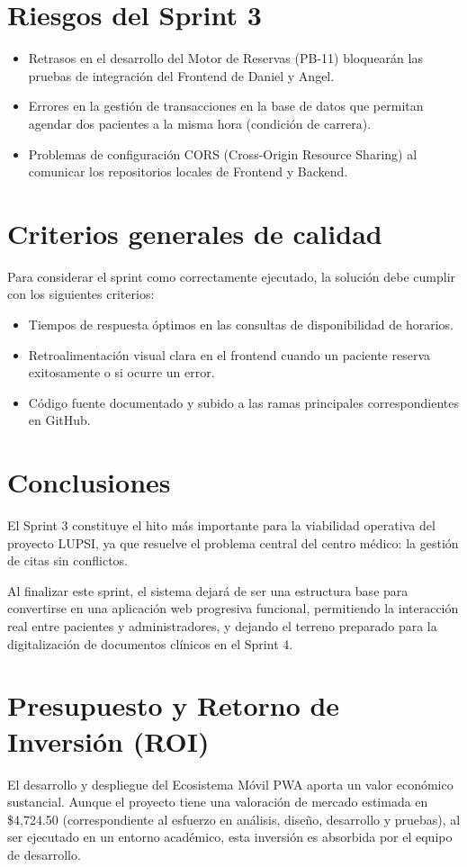 \documentclass[a4paper,12pt]{article}
\begin{document}
\section{Riesgos del Sprint 3}
\begin{itemize}
    \item Retrasos en el desarrollo del Motor de Reservas (PB-11) bloquearán las pruebas de integración del Frontend de Daniel y Angel.
    \item Errores en la gestión de transacciones en la base de datos que permitan agendar dos pacientes a la misma hora (condición de carrera).
    \item Problemas de configuración CORS (Cross-Origin Resource Sharing) al comunicar los repositorios locales de Frontend y Backend.
\end{itemize}

\section{Criterios generales de calidad}
Para considerar el sprint como correctamente ejecutado, la solución debe cumplir con los siguientes criterios:
\begin{itemize}
    \item Tiempos de respuesta óptimos en las consultas de disponibilidad de horarios.
    \item Retroalimentación visual clara en el frontend cuando un paciente reserva exitosamente o si ocurre un error.
    \item Código fuente documentado y subido a las ramas principales correspondientes en GitHub.
\end{itemize}

\section{Conclusiones}
El Sprint 3 constituye el hito más importante para la viabilidad operativa del proyecto LUPSI, ya que resuelve el problema central del centro médico: la gestión de citas sin conflictos. 

Al finalizar este sprint, el sistema dejará de ser una estructura base para convertirse en una aplicación web progresiva funcional, permitiendo la interacción real entre pacientes y administradores, y dejando el terreno preparado para la digitalización de documentos clínicos en el Sprint 4.

\section{Presupuesto y Retorno de Inversión (ROI)}
El desarrollo y despliegue del Ecosistema Móvil PWA aporta un valor económico sustancial. Aunque el proyecto tiene una valoración de mercado estimada en \$4,724.50 (correspondiente al esfuerzo en análisis, diseño, desarrollo y pruebas), al ser ejecutado en un entorno académico, esta inversión es absorbida por el equipo de desarrollo.
\end{document}
